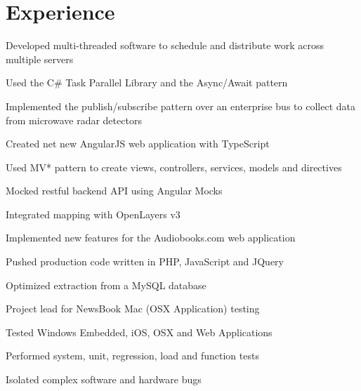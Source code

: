 \documentclass[]{deedy-resume-openfont}
\begin{document}
\begin{minipage}[t]{0.66\textwidth}


\section{Experience}

\vspace{\topsep} %
\begin{tightemize}
\item Developed multi-threaded software to schedule and distribute work across multiple servers
\item Used the C\# Task Parallel Library and the Async/Await pattern
\item Implemented the publish/subscribe pattern over an enterprise bus to collect data from microwave radar detectors
\item Created net new AngularJS web application with TypeScript
\item Used MV* pattern to create views, controllers, services, models and directives
\item Mocked restful backend API using Angular Mocks
\item Integrated mapping with OpenLayers v3
\end{tightemize}
\sectionsep

\begin{tightemize}
\item Implemented new features for the Audiobooks.com web application
\item Pushed production code written in PHP, JavaScript and JQuery
\item Optimized extraction from a MySQL database
\end{tightemize}
\sectionsep

\begin{tightemize}
\item Project lead for NewsBook Mac (OSX Application) testing
\item Tested Windows Embedded, iOS, OSX and Web Applications
\item Performed system, unit, regression, load and function tests
\item Isolated complex software and hardware bugs
\end{tightemize}
\sectionsep


\end{minipage}
\end{document}

